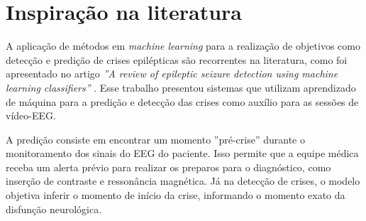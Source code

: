 
\section{Inspiração na literatura}

A aplicação de métodos em \textit{machine learning} para a realização de objetivos como detecção e predição de crises epilépticas são recorrentes na literatura, como foi apresentado no artigo \textit{''A review of epileptic seizure detection using machine learning classifiers''} \cite{Siddiqui2020}. Esse trabalho presentou sistemas que utilizam aprendizado de máquina para a predição e detecção das crises como auxílio para as sessões de vídeo-EEG. 

A predição consiste em encontrar um momento ''pré-crise'' durante o monitoramento dos sinais do EEG do paciente. Isso permite que a equipe médica receba um alerta prévio para realizar os preparos para o diagnóstico, como inserção de contraste e ressonância magnética. Já na detecção de crises, o modelo objetiva inferir o momento de início da crise, informando o momento exato da disfunção neurológica.


